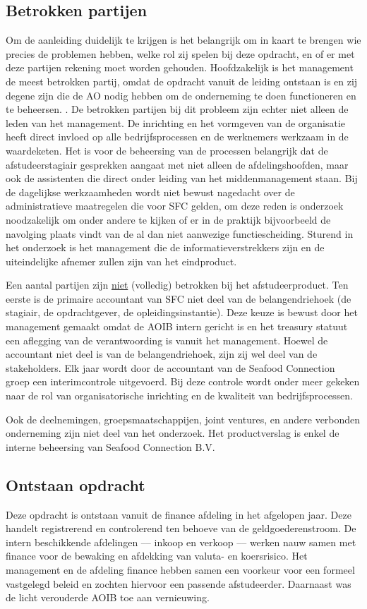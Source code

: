 \documentclass[10pt,a4paper,oneside]{report}
\begin{document}
\subsection{Betrokken partijen}
Om de aanleiding duidelijk te krijgen is het belangrijk om in kaart te brengen wie precies de problemen hebben, welke rol zij spelen bij deze opdracht, en of er met deze partijen rekening moet worden gehouden. Hoofdzakelijk is het management de meest betrokken partij, omdat de opdracht vanuit de leiding ontstaan is en zij degene zijn die de AO nodig hebben om de onderneming te doen functioneren en te beheersen. \citep{bivperspectief}. De betrokken partijen bij dit probleem zijn echter niet alleen de leden van het management. De inrichting en het vormgeven van de organisatie heeft direct invloed op alle bedrijfsprocessen en de werknemers werkzaam in de waardeketen. Het is voor de beheersing van de processen belangrijk dat de afstudeerstagiair gesprekken aangaat met niet alleen de afdelingshoofden, maar ook de assistenten die direct onder leiding van het middenmanagement staan. Bij de dagelijkse werkzaamheden wordt niet bewust nagedacht over de administratieve maatregelen die voor SFC gelden, om deze reden is onderzoek noodzakelijk om onder andere te kijken of er in de praktijk bijvoorbeeld de navolging plaats vindt van de al dan niet aanwezige functiescheiding. Sturend in het onderzoek is het management die de informatieverstrekkers zijn en de uiteindelijke afnemer zullen zijn van het eindproduct. 

Een aantal partijen zijn \underline{niet} (volledig) betrokken bij het afstudeerproduct. Ten eerste is de primaire accountant van SFC niet deel van de belangendriehoek (de stagiair, de opdrachtgever, de opleidingsinstantie). Deze keuze is bewust door het management gemaakt omdat de AOIB intern gericht is en het treasury statuut een aflegging van de verantwoording is vanuit het management. Hoewel de accountant niet deel is van de belangendriehoek, zijn zij wel deel van de stakeholders. Elk jaar wordt door de accountant van de Seafood Connection groep een interimcontrole uitgevoerd. Bij deze controle wordt onder meer gekeken naar de rol van organisatorische inrichting en de kwaliteit van bedrijfsprocessen. \citep{jaarrapport2017}

Ook de deelnemingen, groepsmaatschappijen, joint ventures, en andere verbonden onderneming zijn niet deel van het onderzoek. Het productverslag is enkel de interne beheersing van Seafood Connection B.V.

\subsection{Ontstaan opdracht}
Deze opdracht is ontstaan vanuit de finance afdeling in het afgelopen jaar. Deze handelt registrerend en controlerend ten behoeve van de geldgoederenstroom. De intern beschikkende afdelingen –-- inkoop en verkoop --– werken nauw samen met finance voor de bewaking en afdekking van valuta- en koersrisico. Het management en de afdeling finance hebben samen een voorkeur voor een formeel vastgelegd beleid en zochten hiervoor een passende afstudeerder. Daarnaast was de licht verouderde AOIB toe aan vernieuwing.
\end{document}
